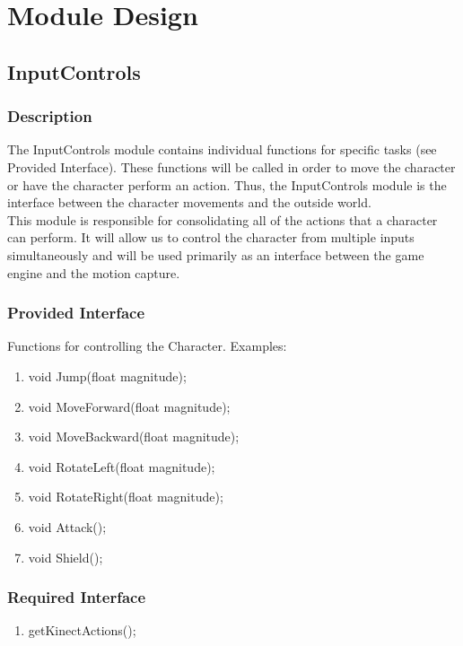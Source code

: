 \documentclass[10pt,letterpaper,oneside,english]{article}
\begin{document}
\section{Module Design}

\subsection{InputControls}

\subsubsection{Description}
The InputControls module contains individual functions for specific tasks (see Provided Interface). These functions will be called in order to move the character or have the character perform an action. Thus, the InputControls module is the interface between the character movements and the outside world.\\
This module is responsible for consolidating all of the actions that a character can perform. It will allow us to control the character from multiple inputs simultaneously and will be used primarily as an interface between the game engine and the motion capture.

\subsubsection{Provided Interface}
Functions for controlling the Character. Examples:
\begin{enumerate}
	\item void Jump(float magnitude);
	\item void MoveForward(float magnitude);
	\item void MoveBackward(float magnitude);
	\item void RotateLeft(float magnitude);
	\item void RotateRight(float magnitude);
	\item void Attack();
    \item void Shield();
\end{enumerate}

\subsubsection{Required Interface}
\begin{enumerate}
\item getKinectActions();
\end{enumerate}
\end{document}
